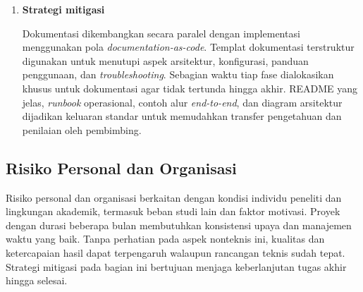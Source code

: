 \begin{enumerate}
\begin{enumerate}[label=\alph*)]
        \vspace{0.5em}
        
        \item \textbf{Strategi mitigasi}
        
        Dokumentasi dikembangkan secara paralel dengan implementasi menggunakan pola \textit{documentation-as-code}. Templat dokumentasi terstruktur digunakan untuk menutupi aspek arsitektur, konfigurasi, panduan penggunaan, dan \textit{troubleshooting}. Sebagian waktu tiap fase dialokasikan khusus untuk dokumentasi agar tidak tertunda hingga akhir. README yang jelas, \textit{runbook} operasional, contoh alur \textit{end-to-end}, dan diagram arsitektur dijadikan keluaran standar untuk memudahkan transfer pengetahuan dan penilaian oleh pembimbing.
    \end{enumerate}
\end{enumerate}

\subsection{Risiko Personal dan Organisasi}

Risiko personal dan organisasi berkaitan dengan kondisi individu peneliti dan lingkungan akademik, termasuk beban studi lain dan faktor motivasi. Proyek dengan durasi beberapa bulan membutuhkan konsistensi upaya dan manajemen waktu yang baik. Tanpa perhatian pada aspek nonteknis ini, kualitas dan ketercapaian hasil dapat terpengaruh walaupun rancangan teknis sudah tepat. Strategi mitigasi pada bagian ini bertujuan menjaga keberlanjutan tugas akhir hingga selesai.

\vspace{0.5em}


